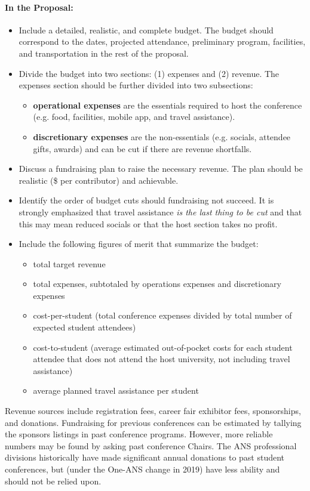 \documentclass[12pt]{article}
\begin{document}
\paragraph{In the Proposal:}
\begin{itemize}
\item{Include a detailed, realistic, and complete budget. The budget should correspond to the dates, projected attendance, preliminary program, facilities, and transportation in the rest of the proposal.}
\item{Divide the budget into two sections: (1) expenses and (2) revenue. The expenses section should be further divided into two subsections:
\begin{itemize}
\item{\textbf{operational expenses} are the essentials required to host the conference (e.g. food, facilities, mobile app, and travel assistance).}
\item{\textbf{discretionary expenses} are the non-essentials (e.g. socials, attendee gifts, awards) and can be cut if there are revenue shortfalls.}
\end{itemize}
}
\item{Discuss a fundraising plan to raise the necessary revenue. The plan should be realistic (\$ per contributor) and achievable.}
\item{Identify the order of budget cuts should fundraising not succeed. It is strongly emphasized that travel assistance \textit{is the last thing to be cut} and that this may mean reduced socials or that the host section takes no profit.}
\item{Include the following figures of merit that summarize the budget:
\begin{itemize}
\item{total target revenue}
\item{total expenses, subtotaled by operations expenses and discretionary expenses}
\item{cost-per-student (total conference expenses divided by total number of expected student attendees)}
\item{cost-to-student (average estimated out-of-pocket costs for each student attendee that does not attend the host university, not including travel assistance)}
\item{average planned travel assistance per student}
\end{itemize}
}
\end{itemize}

Revenue sources include registration fees, career fair exhibitor fees, sponsorships, and donations. Fundraising for previous conferences can be estimated by tallying the sponsors listings in past conference programs. However, more reliable numbers may be found by asking past conference Chairs. The ANS professional divisions historically have made significant annual donations to past student conferences, but (under the One-ANS change in 2019) have less ability and should not be relied upon.
\end{document}
